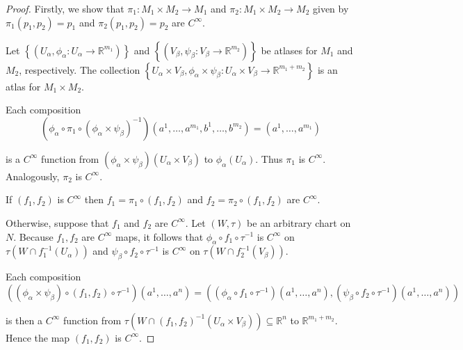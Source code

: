 \begin{proof}
    Firstly, we show that \( \pi_{1}: M_{1} \times M_{2} \to M_{1} \) and \( \pi_{2}: M_{1} \times M_{2} \to M_{2} \) given by \( \pi_{1}(p_{1}, p_{2}) = p_{1} \) and \( \pi_{2}(p_{1}, p_{2}) = p_{2} \) are \( C^{\infty} \).

    Let \( \left\{ (U_{\alpha}, \phi_{\alpha}: U_{\alpha} \to \mathbb{R}^{m_{1}}) \right\} \) and \( \left\{ (V_{\beta}, \psi_{\beta}: V_{\beta} \to \mathbb{R}^{m_{2}}) \right\} \) be atlases for \( M_{1} \) and \( M_{2} \), respectively. The collection \( \left\{ U_{\alpha} \times V_{\beta}, \phi_{\alpha} \times \psi_{\beta}: U_{\alpha} \times V_{\beta} \to \mathbb{R}^{m_{1} + m_{2}} \right\} \) is an atlas for \( M_{1} \times M_{2} \).

    Each composition
    \[
        (\phi_{\alpha} \circ \pi_{1}\circ {(\phi_{\alpha} \times \psi_{\beta})}^{-1})(a^{1}, \ldots, a^{m_{1}}, b^{1}, \ldots, b^{m_{2}}) = (a^{1}, \ldots, a^{m_{1}})
    \]

    is a \( C^{\infty} \) function from \( (\phi_{\alpha} \times \psi_{\beta})(U_{\alpha} \times V_{\beta}) \) to \( \phi_{\alpha}(U_{\alpha}) \). Thus \( \pi_{1} \) is \( C^{\infty} \). Analogously, \( \pi_{2} \) is \( C^{\infty} \).

    If \( (f_{1}, f_{2}) \) is \( C^{\infty} \) then \( f_{1} = \pi_{1} \circ (f_{1}, f_{2}) \) and \( f_{2} = \pi_{2} \circ (f_{1}, f_{2}) \) are \( C^{\infty} \).

    Otherwise, suppose that \( f_{1} \) and \( f_{2} \) are \( C^{\infty} \). Let \( (W, \tau) \) be an arbitrary chart on \( N \). Because \( f_{1}, f_{2} \) are  \( C^{\infty} \) maps, it follows that \( \phi_{\alpha} \circ f_{1}\circ \tau^{-1} \) is \( C^{\infty} \) on \( \tau(W \cap f_{1}^{-1}(U_{\alpha})) \) and \( \psi_{\beta} \circ f_{2} \circ \tau^{-1} \) is \( C^{\infty} \) on \( \tau(W \cap f_{2}^{-1}(V_{\beta})) \).

    Each composition
    \[
        ((\phi_{\alpha} \times \psi_{\beta}) \circ (f_{1}, f_{2}) \circ \tau^{-1})(a^{1}, \ldots, a^{n}) = ((\phi_{\alpha} \circ f_{1} \circ \tau^{-1})(a^{1}, \ldots, a^{n}), (\psi_{\beta} \circ f_{2} \circ \tau^{-1})(a^{1}, \ldots, a^{n}))
    \]

    is then a \( C^{\infty} \) function from \( \tau(W \cap {(f_{1}, f_{2})}^{-1}(U_{\alpha} \times V_{\beta})) \subseteq \mathbb{R}^{n} \) to \( \mathbb{R}^{m_{1} + m_{2}} \). Hence the map \( (f_{1}, f_{2}) \) is \( C^{\infty} \).
\end{proof}

